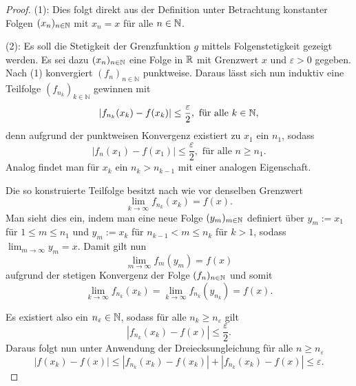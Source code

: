 \begin{proof}
  (1): 
  Dies folgt direkt aus der Definition unter Betrachtung konstanter Folgen $(x_n)_{n \in \mathbb{N}}$ mit $x_n = x$ für alle $n \in \mathbb{N}$.

  (2): 
  Es soll die Stetigkeit der Grenzfunktion $g$ mittels Folgenstetigkeit gezeigt werden. 
  Es sei dazu $(x_n)_{n \in \mathbb{N}}$ eine Folge in $\mathbb{R}$ mit Grenzwert $x$ und $\varepsilon > 0$ gegeben.
  Nach (1) konvergiert $(f_n)_{n \in \mathbb{N}}$ punktweise.
  Daraus lässt sich nun induktiv eine Teilfolge $(f_{n_k})_{k \in \mathbb{N}}$ gewinnen mit
  \begin{displaymath}
    | f_{n_k}(x_k) - f(x_k) | \leq \frac{\varepsilon}{2}, \text{ für alle $k \in \mathbb{N}$},
  \end{displaymath}
  denn aufgrund der punktweisen Konvergenz existiert zu $x_1$ ein $n_1$, sodass
  \begin{displaymath}
    | f_{n}(x_1) - f(x_1) | \leq \frac{\varepsilon}{2}, \text{ für alle $n \geq n_1$}.
  \end{displaymath}
  Analog findet man für $x_k$ ein $n_k > n_{k-1}$ mit einer analogen Eigenschaft.

  Die so konstruierte Teilfolge besitzt nach wie vor denselben Grenzwert
  \begin{displaymath}
    \lim_{k \to \infty} f_{n_k}(x_k) = f(x).
  \end{displaymath}
  Man sieht dies ein, indem man eine neue Folge $(y_m)_{m \in \mathbb{N}}$ definiert über $y_m:=x_1$ für $1 \leq m \leq n_1$ und $y_m:=x_k$ für $n_{k-1} < m \leq n_{k}$ für $k > 1$, sodass $\lim_{m \to \infty} y_m = x$.
  Damit gilt nun
  \begin{displaymath}
    \lim_{m \to \infty} f_m(y_m) = f(x)
  \end{displaymath}
  aufgrund der stetigen Konvergenz der Folge $(f_n)_{n \in \mathbb{N}}$ und somit
  \begin{displaymath}
    \lim_{k \to \infty} f_{n_k}(x_{k}) 
    = \lim_{k \to \infty} f_{n_k}(y_{n_k}) 
    = f(x).
  \end{displaymath} 

  Es existiert also ein $n_\varepsilon \in \mathbb{N}$, sodass für alle $n_k \geq n_\varepsilon$ gilt
  \begin{displaymath}
    | f_{n_k}(x_k) - f(x) | \leq \frac{\varepsilon}{2}.
  \end{displaymath}
  Daraus folgt nun unter Anwendung der Dreiecksungleichung für alle $n \geq n_\varepsilon$
  \begin{displaymath}
    | f(x_k) - f(x) |
    \leq
    | f_{n_k}(x_k) - f(x_k) | + | f_{n_k}(x_k) - f(x) | 
    \leq \varepsilon.
  \end{displaymath}


\end{proof}
